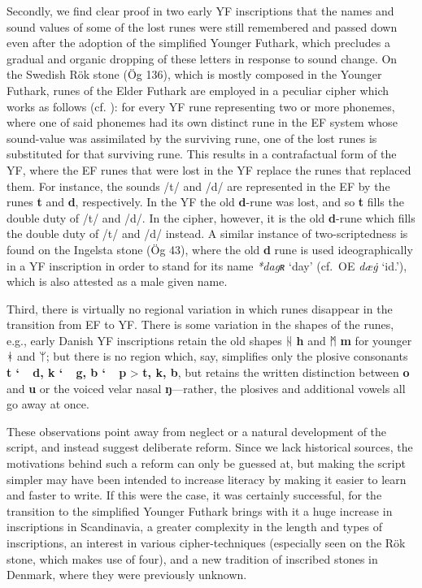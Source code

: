 Secondly, we find clear proof in two early YF inscriptions that the names and sound values of some of the lost runes were still remembered and passed down even after the adoption of the simplified Younger Futhark, which precludes a gradual and organic dropping of these letters in response to sound change.  On the Swedish Rök stone (Ög 136), which is mostly composed in the Younger Futhark, runes of the Elder Futhark are employed in a peculiar cipher which works as follows (cf. \cite{FridellWilliams2021}): for every YF rune representing two or more phonemes, where one of said phonemes had its own distinct rune in the EF system whose sound-value was assimilated by the surviving rune, one of the lost runes is substituted for that surviving rune.  This results in a contrafactual form of the YF, where the EF runes that were lost in the YF replace the runes that replaced them.
For instance, the sounds /t/ and /d/ are represented in the EF by the runes \textbf{t} and \textbf{d}, respectively.  In the YF the old \textbf{d}-rune was lost, and so \textbf{t} fills the double duty of /t/ and /d/.  In the cipher, however, it is the old \textbf{d}-rune which fills the double duty of /t/ and /d/ instead.  A similar instance of two-scriptedness is found on the Ingelsta stone (Ög 43), where the old \textbf{d} rune is used ideographically in a YF inscription in order to stand for its name \emph{*dagʀ} ‘day’ (cf.~OE \emph{dæġ} ‘id.’), which is also attested as a male given name.

Third, there is virtually no regional variation in which runes disappear in the transition from EF to YF.  There is some variation in the shapes of the runes, e.g., early Danish YF inscriptions retain the old shapes ᚺ \textbf{h} and ᛗ \textbf{m} for younger ᚼ and ᛘ; but there is no region which, say, simplifies only the plosive consonants \textbf{t \char`~\ d, k \char`~\ g, b \char`~\ p} > \textbf{t, k, b}, but retains the written distinction between \textbf{o} and \textbf{u} or the voiced velar nasal \textbf{ŋ}---rather, the plosives and additional vowels all go away at once.

These observations point away from neglect or a natural development of the script, and instead suggest deliberate reform.  Since we lack historical sources, the motivations behind such a reform can only be guessed at, but making the script simpler may have been intended to increase literacy by making it easier to learn and faster to write.  If this were the case, it was certainly successful, for the transition to the simplified Younger Futhark brings with it a huge increase in inscriptions in Scandinavia, a greater complexity in the length and types of inscriptions, an interest in various cipher-techniques (especially seen on the Rök stone, which makes use of four), and a new tradition of inscribed stones in Denmark, where they were previously unknown.

